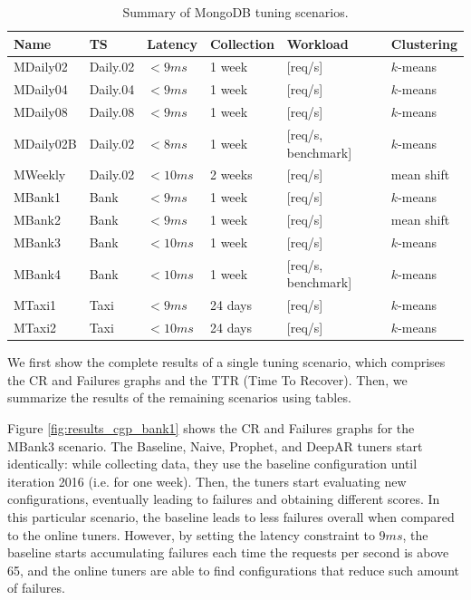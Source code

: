 \documentclass[a4paper, 12pt]{article} %
\newcommand{\ra}[1]{\renewcommand{\arraystretch}{#1}}
\begin{document}
	\begin{table}\centering 
		\ra{1.3}
		\begin{tabularx}{\textwidth}{@{}llllXX@{}}
			\midrule
			Name & TS & Latency & Collection & Workload & Clustering\\
			\midrule
			MDaily02&Daily.02 & $<9ms$  & 1 week & [req/s]  & $k$-means\\
			MDaily04&Daily.04 & $<9ms$  & 1 week & [req/s]  & $k$-means\\
			MDaily08&Daily.08 & $<9ms$  & 1 week & [req/s] & $k$-means\\
			MDaily02B&Daily.02 & $<8ms$  & 1 week & [req/s, benchmark] & $k$-means\\
			MWeekly&Daily.02 & $<10ms$  & 2 weeks & [req/s]  & mean shift\\
			MBank1&Bank & $<9ms$  & 1 week & [req/s]  & $k$-means\\
			MBank2&Bank & $<9ms$  & 1 week & [req/s]  & mean shift\\
			MBank3&Bank & $<10ms$  & 1 week & [req/s]  & $k$-means\\
			MBank4&Bank & $<10ms$  & 1 week & [req/s, benchmark]  & $k$-means\\
			MTaxi1 &Taxi & $<9ms$  & 24 days & [req/s]  & $k$-means\\
			MTaxi2 &Taxi & $<10ms$  & 24 days & [req/s]  & $k$-means\\
			
			\bottomrule
		\end{tabularx}
	\caption{Summary of MongoDB tuning scenarios. }  \label{table:results_tuning_scenarios}
	\end{table}
	
	We first show the complete results of a single tuning scenario, which comprises the CR and Failures graphs and the TTR (Time To Recover). Then, we summarize the results of the remaining scenarios using tables.
	
	Figure \ref{fig:results_cgp_bank1} shows the CR and Failures graphs for the MBank3 scenario. The Baseline, Naive, Prophet, and DeepAR tuners start identically: while collecting data, they use the baseline configuration until iteration 2016 (i.e. for one week). Then, the tuners start evaluating new configurations, eventually leading to failures and obtaining different scores. In this particular scenario, the baseline leads to less failures overall when compared to the online tuners. However, by setting the latency constraint to $9ms$, the baseline starts accumulating failures each time the requests per second is above 65, and the online tuners are able to find configurations that reduce such amount of failures. 
	 
\end{document}
